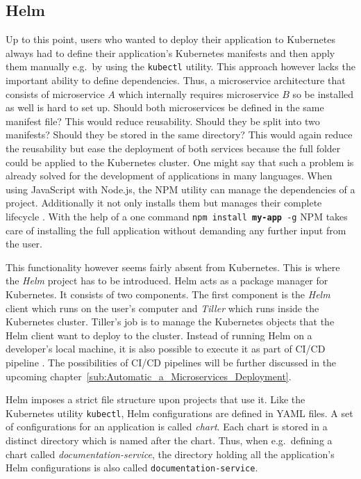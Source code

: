 
\subsection{Helm}%
\label{sub:Helm}
Up to this point, users who wanted to deploy their application to Kubernetes
always had to define their application's Kubernetes manifests and then apply them
manually e.g.\ by using the \texttt{kubectl} utility. This approach however
lacks the important ability to define dependencies. Thus, a microservice
architecture that consists of microservice $A$ which internally requires
microservice $B$ so be installed as well is hard to set up. Should both
microservices be defined in the same manifest file? This would reduce
reusability. Should they be split into two manifests? Should they be stored in
the same directory? This would again reduce the reusability but ease the
deployment of both services because the full folder could be applied to the
Kubernetes cluster. One might say that such a problem is already solved for the
development of applications in many languages. When using JavaScript with
Node.js, the \ac{NPM} utility can manage the dependencies of a project.
Additionally it not only installs them but manages their complete lifecycle
\autocite{npm}. With the help of a one command \texttt{npm install
\textbf{my-app} -g} \ac{NPM} takes care of installing the full application
without demanding any further input from the user.

This functionality however seems fairly absent from Kubernetes. This is where
the \textit{Helm} project has to be introduced. Helm acts as a package manager
for Kubernetes. It consists of two components. The first component is the
\textit{Helm} client which runs on the user's computer and \textit{Tiller}
which runs inside the Kubernetes cluster. Tiller's job is to manage the
Kubernetes objects that the Helm client want to deploy to the cluster. Instead
of running Helm on a developer's local machine, it is also possible to execute
it as part of \ac{CI}/\ac{CD} pipeline \autocite{HelmDocumentationQuickstart}.
The possibilities of \ac{CI}/\ac{CD} pipelines will be further discussed in the
upcoming chapter~\ref{sub:Automatic_a_Microservices_Deployment}.

Helm imposes a strict file structure upon projects that use it. Like the
Kubernetes utility \texttt{kubectl}, Helm configurations are defined in YAML
files. A set of configurations for an application is called \textit{chart}.
Each chart is stored in a distinct directory which is named after the chart.
Thus, when e.g.\ defining a chart called \textit{documentation-service}, the
directory holding all the application's Helm configurations is also called
\texttt{documentation-service}. 

